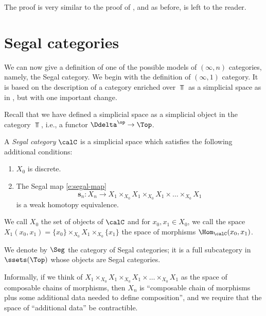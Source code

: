 The proof is very similar to the proof of , and as before, is
left to the reader.



\section{Segal categories}\label{s:segal-cat}
We can now give a definition of one of the possible models of $(\infty, n)$
categories, namely, the Segal category. We begin with the definition of
$(\infty, 1)$ category. It is based on the description of a category enriched
over $\Top$ as a simplicial space as in , but with one
important change.

Recall that we have defined a simplicial space as a simplicial object in the
category $\Top$, i.e., a functor $\Ddelta^\op\to \Top$.

\begin{definition}\label{d:segal-cat}
  A \emph{Segal category} $\calC$ is a simplicial space which satisfies the
  following additional conditions:
  \begin{enumerate}
    \item $X_0$ is discrete.
    \item The Segal map \eqref{e:segal-map}
      $$
        \mathbf{s}_n \colon X_n \to
        X_1\times_{X_0} X_1\times_{X_0} X_1 \times\dots \times_{X_0} X_1
      $$
      is a weak homotopy equivalence.
  \end{enumerate}
  We call $X_0$ the set of objects of $\calC$ and for $x_0, x_1\in X_0$, we call
  the space $X_1(x_0, x_1) = \{x_0\}\times_{X_0} X_1 \times_{X_0}\{x_1\}$ the space of
  morphisms $\Hom_{\calC}(x_0, x_1)$.
\end{definition}

We denote by $\Seg$ the category of Segal categories; it is a full subcategory
in $\ssets(\Top)$ whose objects are Segal categories.

Informally, if we think of $X_1\times_{X_0} X_1\times_{X_0} X_1
\times\dots \times_{X_0} X_1$ as the space of composable chains of morphisms,
then $X_n$ is ``composable chain of morphisms plus some additional data needed
to define composition'', and we require that the space of ``additional data'' be
contractible.

